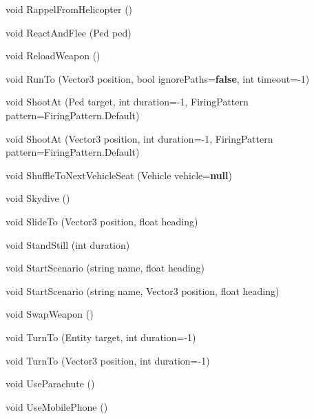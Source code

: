 \documentclass[
  openany]{book}
\newenvironment{Shaded}{\begin{snugshade}}{\end{snugshade}}
\newcommand{\DataTypeTok}[1]{\textcolor[rgb]{0.13,0.29,0.53}{#1}}
\newcommand{\DecValTok}[1]{\textcolor[rgb]{0.00,0.00,0.81}{#1}}
\newcommand{\FunctionTok}[1]{\textcolor[rgb]{0.00,0.00,0.00}{#1}}
\newcommand{\KeywordTok}[1]{\textcolor[rgb]{0.13,0.29,0.53}{\textbf{#1}}}
\newcommand{\NormalTok}[1]{#1}
\begin{document}
\begin{Shaded}
\begin{Highlighting}[]
\DataTypeTok{void} \FunctionTok{RappelFromHelicopter}\NormalTok{ ()}
 
\DataTypeTok{void} \FunctionTok{ReactAndFlee}\NormalTok{ (Ped ped)}
 
\DataTypeTok{void} \FunctionTok{ReloadWeapon}\NormalTok{ ()}
 
\DataTypeTok{void} \FunctionTok{RunTo}\NormalTok{ (Vector3 position, }\DataTypeTok{bool}\NormalTok{ ignorePaths=}\KeywordTok{false}\NormalTok{, }\DataTypeTok{int}\NormalTok{ timeout=-}\DecValTok{1}\NormalTok{)}
 
\DataTypeTok{void} \FunctionTok{ShootAt}\NormalTok{ (Ped target, }\DataTypeTok{int}\NormalTok{ duration=-}\DecValTok{1}\NormalTok{, FiringPattern pattern=FiringPattern.}\FunctionTok{Default}\NormalTok{)}
 
\DataTypeTok{void} \FunctionTok{ShootAt}\NormalTok{ (Vector3 position, }\DataTypeTok{int}\NormalTok{ duration=-}\DecValTok{1}\NormalTok{, FiringPattern pattern=FiringPattern.}\FunctionTok{Default}\NormalTok{)}
 
\DataTypeTok{void} \FunctionTok{ShuffleToNextVehicleSeat}\NormalTok{ (Vehicle vehicle=}\KeywordTok{null}\NormalTok{)}
 
\DataTypeTok{void} \FunctionTok{Skydive}\NormalTok{ ()}
 
\DataTypeTok{void} \FunctionTok{SlideTo}\NormalTok{ (Vector3 position, }\DataTypeTok{float}\NormalTok{ heading)}
 
\DataTypeTok{void} \FunctionTok{StandStill}\NormalTok{ (}\DataTypeTok{int}\NormalTok{ duration)}
 
\DataTypeTok{void} \FunctionTok{StartScenario}\NormalTok{ (}\DataTypeTok{string}\NormalTok{ name, }\DataTypeTok{float}\NormalTok{ heading)}
 
\DataTypeTok{void} \FunctionTok{StartScenario}\NormalTok{ (}\DataTypeTok{string}\NormalTok{ name, Vector3 position, }\DataTypeTok{float}\NormalTok{ heading)}
 
\DataTypeTok{void} \FunctionTok{SwapWeapon}\NormalTok{ ()}
 
\DataTypeTok{void} \FunctionTok{TurnTo}\NormalTok{ (Entity target, }\DataTypeTok{int}\NormalTok{ duration=-}\DecValTok{1}\NormalTok{)}
 
\DataTypeTok{void} \FunctionTok{TurnTo}\NormalTok{ (Vector3 position, }\DataTypeTok{int}\NormalTok{ duration=-}\DecValTok{1}\NormalTok{)}
 
\DataTypeTok{void} \FunctionTok{UseParachute}\NormalTok{ ()}
 
\DataTypeTok{void} \FunctionTok{UseMobilePhone}\NormalTok{ ()}
 

\end{Highlighting}
\end{Shaded}
\end{document}
